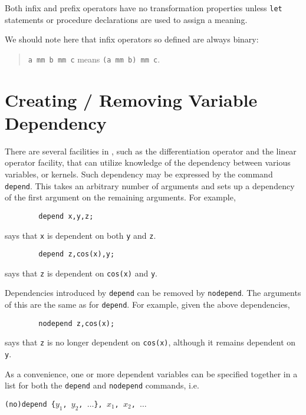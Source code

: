 Both infix and prefix operators have no transformation
properties unless \texttt{let} statements or procedure
declarations are used to assign a meaning.

We should note here that infix operators so defined are always binary:
\begin{quote}
\hspace{0.2in}\texttt{a mm b mm c}\hspace{.3in} means \hspace{.3in}
\texttt{(a mm b) mm c}.
\end{quote}

\section{Creating / Removing Variable Dependency}
\hypertarget{command:DEPEND}{}
\hypertarget{command:NODEPEND}{}

There are several facilities in {\REDUCE}, such as the differentiation
operator and the linear operator facility, that
can utilize knowledge of the dependency between various variables, or
kernels.  Such dependency may be expressed by the command
\texttt{depend}.
This takes an arbitrary number of arguments and
sets up a dependency of the first argument on the remaining arguments.
For example,
\begin{verbatim}
        depend x,y,z;
\end{verbatim}
says that \texttt{x} is dependent on both \texttt{y} and \texttt{z}.
\begin{verbatim}
        depend z,cos(x),y;
\end{verbatim}
says that \texttt{z} is dependent on \texttt{cos(x)} and \texttt{y}.

Dependencies introduced by \texttt{depend} can be removed by \texttt{nodepend}.
 The arguments of this are the same as for \texttt{depend}.
For example, given the above dependencies,
\begin{verbatim}
        nodepend z,cos(x);
\end{verbatim}
says that \texttt{z} is no longer dependent on \texttt{cos(x)}, although it remains
dependent on \texttt{y}.

As a convenience, one or more dependent variables can be specified
together in a list for both the \texttt{depend} and \texttt{nodepend}
commands, i.e.

\texttt{(no)depend \{$y_1$, $y_2$, $\ldots$\}, $x_1$, $x_2$, $\ldots$}


